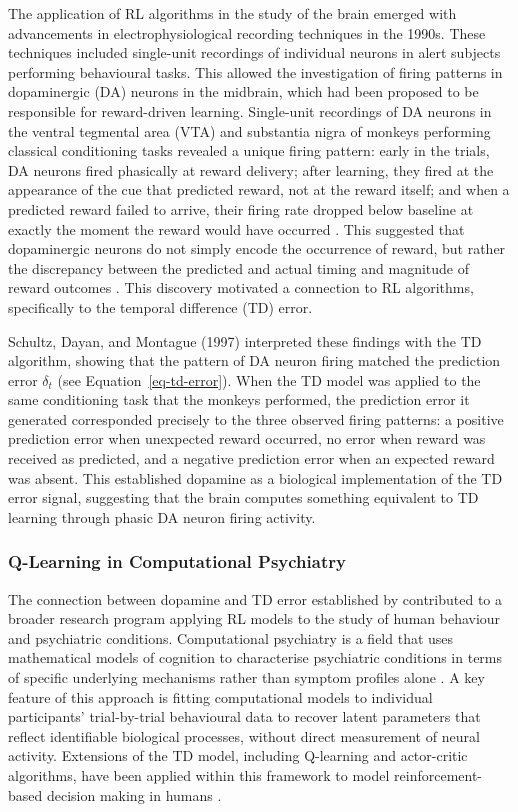 \documentclass[
  authoryear,
  preprint]{elsarticle}
\begin{document}
The application of RL algorithms in the study of the brain emerged with
advancements in electrophysiological recording techniques in the 1990s.
These techniques included single-unit recordings of individual neurons
in alert subjects performing behavioural tasks. This allowed the
investigation of firing patterns in dopaminergic (DA) neurons in the
midbrain, which had been proposed to be responsible for reward-driven
learning. Single-unit recordings of DA neurons in the ventral tegmental
area (VTA) and substantia nigra of monkeys performing classical
conditioning tasks revealed a unique firing pattern: early in the
trials, DA neurons fired phasically at reward delivery; after learning,
they fired at the appearance of the cue that predicted reward, not at
the reward itself; and when a predicted reward failed to arrive, their
firing rate dropped below baseline at exactly the moment the reward
would have occurred \citep{Schultz1997}. This suggested that
dopaminergic neurons do not simply encode the occurrence of reward, but
rather the discrepancy between the predicted and actual timing and
magnitude of reward outcomes \citep{Schultz1997}. This discovery
motivated a connection to RL algorithms, specifically to the temporal
difference (TD) error.

Schultz, Dayan, and Montague (1997) interpreted these findings with the
TD algorithm, showing that the pattern of DA neuron firing matched the
prediction error \(\delta_t\) (see Equation~\ref{eq-td-error}). When the
TD model was applied to the same conditioning task that the monkeys
performed, the prediction error it generated corresponded precisely to
the three observed firing patterns: a positive prediction error when
unexpected reward occurred, no error when reward was received as
predicted, and a negative prediction error when an expected reward was
absent. This established dopamine as a biological implementation of the
TD error signal, suggesting that the brain computes something equivalent
to TD learning through phasic DA neuron firing activity.

\subsubsection{Q-Learning in Computational
Psychiatry}\label{sec-compsych}

The connection between dopamine and TD error established by
\citet{Schultz1997} contributed to a broader research program applying
RL models to the study of human behaviour and psychiatric conditions.
Computational psychiatry is a field that uses mathematical models of
cognition to characterise psychiatric conditions in terms of specific
underlying mechanisms rather than symptom profiles alone
\citep{Huys2016}. A key feature of this approach is fitting
computational models to individual participants' trial-by-trial
behavioural data to recover latent parameters that reflect identifiable
biological processes, without direct measurement of neural activity.
Extensions of the TD model, including Q-learning and actor-critic
algorithms, have been applied within this framework to model
reinforcement-based decision making in humans \citep{Samson2010}.
\end{document}
